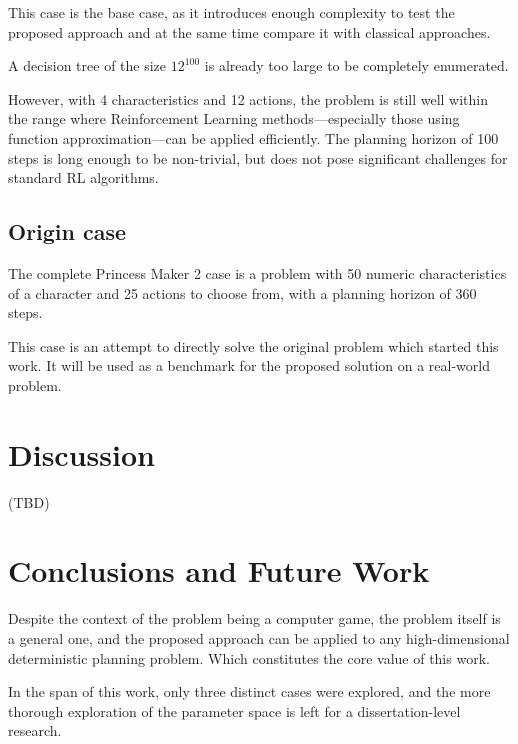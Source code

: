 \documentclass[11pt, a4paper]{article}
\begin{document}
	This case is the base case, as it introduces enough complexity to test the proposed approach and at the same time compare it with classical approaches.

	A decision tree of the size $12^{100}$ is already too large to be completely enumerated.

	However, with 4 characteristics and 12 actions, the problem is still well within the range where Reinforcement Learning methods—especially those using function approximation—can be applied efficiently.
	The planning horizon of 100 steps is long enough to be non-trivial, but does not pose significant challenges for standard RL algorithms.

	\subsection{Origin case}

	The complete Princess Maker 2 case is a problem with 50 numeric characteristics of a character and 25 actions to choose from, with a planning horizon of 360 steps.

	This case is an attempt to directly solve the original problem which started this work.
	It will be used as a benchmark for the proposed solution on a real-world problem.

	\section{Discussion}

	(TBD)
	
	\section{Conclusions and Future Work}

	Despite the context of the problem being a computer game, the problem itself is a general one, and the proposed approach can be applied to any high-dimensional deterministic planning problem.
	Which constitutes the core value of this work.

	In the span of this work, only three distinct cases were explored, and the more thorough exploration of the parameter space is left for a dissertation-level research.

	\printbibliography
\end{document}

